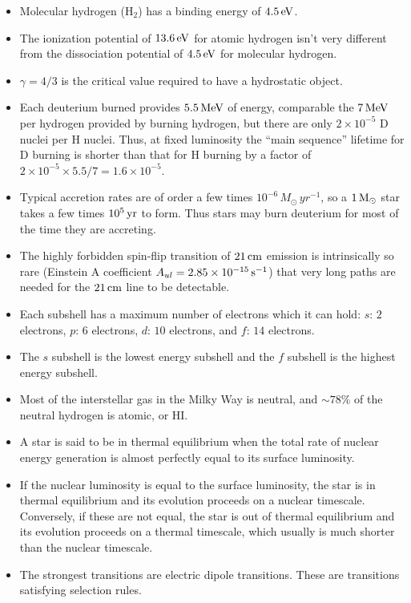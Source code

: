 \documentclass[a4paper,10pt]{article}
\begin{document}
\begin{itemize}
    \item Molecular hydrogen (H$_2$) has a binding energy of $4.5\,{\rm eV}$.
    \item The ionization potential of $13.6\,{\rm eV}$ for atomic hydrogen isn't very different from the dissociation potential of $4.5\,{\rm eV}$ for molecular hydrogen.
    \item $\gamma=4/3$ is the critical value required to have a hydrostatic object.
    \item Each deuterium burned provides $5.5\,{\rm MeV}$ of energy, comparable the $7\,{\rm MeV}$ per hydrogen provided by burning hydrogen, but there are only $2\times10^{-5}$ D nuclei per H nuclei. Thus, at fixed luminosity the ``main sequence'' lifetime for D burning is shorter than that for H burning by a factor of $2\times10^{-5}\times5.5/7 = 1.6\times10^{-5}$.
    \item Typical accretion rates are of order a few times $10^{-6}\,{M_\odot\,yr^{-1}}$, so a $1\,{\rm M_\odot}$ star takes a few times $10^5\,{\rm yr}$ to form. Thus stars may burn deuterium for most of the time they are accreting.
    \item The highly forbidden spin-flip transition of $21\,{\rm cm}$ emission is intrinsically so rare (Einstein A coefficient $A_{ul}=2.85\times10^{-15}\,{\rm s^{-1}}$) that very long paths are needed for the $21\,{\rm cm}$ line to be detectable.
    \item Each subshell has a maximum number of electrons which it can hold: $s$: $2$ electrons, $p$: $6$ electrons, $d$: $10$ electrons, and $f$: $14$ electrons.
    \item The $s$ subshell is the lowest energy subshell and the $f$ subshell is the highest energy subshell.
    \item Most of the interstellar gas in the Milky Way is neutral, and $\sim78\%$ of the neutral hydrogen is atomic, or HI. 
    \item A star is said to be in thermal equilibrium when the total rate of nuclear energy generation is almost perfectly equal to its surface luminosity.
    \item If the nuclear luminosity is equal to the surface luminosity, the star is in thermal equilibrium and its evolution proceeds on a nuclear timescale. Conversely, if these are not equal, the star is out of thermal equilibrium and its evolution proceeds on a thermal timescale, which usually is much shorter than the nuclear timescale.
    \item The strongest transitions are electric dipole transitions. These are transitions satisfying selection rules.

\end{itemize}
\end{document}
